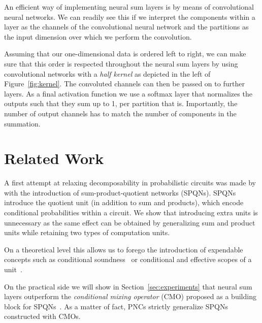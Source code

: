 \documentclass[letterpaper]{article} %
\begin{document}
An efficient way of implementing neural sum layers is by means of convolutional neural networks.
We can readily see this if we interpret the components within a layer as the channels of the convolutional neural network and the partitions as the input dimension over which we perform the convolution.

Assuming that our one-dimensional data is ordered left to right, we can make sure that this order is respected throughout the neural sum layers by using convolutional networks with a \textit{half kernel} as depicted in the left of Figure~\ref{fig:kernel}. The convoluted channels can then be passed on to further layers. As a final activation function we use a softmax layer that normalizes the outputs such that they sum up to 1, per partition that is.
Importantly, the number of output channels has to match the number of components in the summation.








\section{Related Work}
\label{sec:related}

A first attempt at relaxing decomposability in probabilistic circuits was made by \citet{sharir2018sum} with the introduction of sum-product-quotient networks (SPQNs). SPQNs introduce the quotient unit (in addition to sum and products), which encode conditional probabilities within a circuit. We show that introducing extra units is unnecessary as the same effect can be obtained by generalizing sum and product units while retaining two types of computation units.

On a theoretical level this allows us to forego the introduction of expendable concepts such as conditional soundness~\cite[Definition 5]{sharir2018sum} or conditional and effective scopes of a unit~\citep[Section 3]{sharir2018sum}.

On the practical side we will show in Section~\ref{sec:experiments} that neural sum layers outperform the \textit{conditional mixing operator} (CMO) proposed as a building block for SPQNs~\citep[Definition 6]{sharir2018sum}. As a matter of fact, PNCs strictly generalize SPQNs constructed with CMOs.
\end{document}
